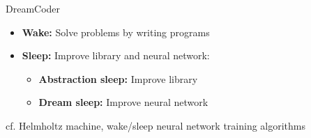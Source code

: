 \documentclass{beamer}
\newcommand{\1}[1]{\mathds{1}\left[#1\right]}
\newcommand\Wider[2][3em]{%
\makebox[\linewidth][c]{%
  \begin{minipage}{\dimexpr\textwidth+#1\relax}
  \raggedright#2
  \end{minipage}%
  }%
}
\begin{document}
\begin{frame}{DreamCoder}
  \begin{itemize}
  \item   \textbf{Wake:} Solve problems by writing programs
  \item \textbf{Sleep:} Improve library and neural network:
    \begin{itemize}
    \item \textbf{Abstraction sleep:} Improve library
      \item \textbf{Dream sleep:} Improve neural network
    \end{itemize}
  \end{itemize}
  \Wider[5.4em]{
    \begin{center}
      \begin{tikzpicture}
  \end{tikzpicture}
        \end{center}}

\hspace*{-0.4cm}\small cf. Helmholtz machine, wake/sleep neural network training algorithms
\end{frame}
\newcommand{\NeuralNetwork}[1]{    \begin{tikzpicture}[x=2.5cm,y=1.25cm,transform canvas={scale=#1,shift={+(-1,2.5)}}]
      \tikzstyle{neuron}=[circle,fill=blue!50,minimum size=20pt]
      \fill[fill=white] (-0.25,-0.5) rectangle (2.25,-4.5);
      \node[rectangle] at (1,1) {};
      \foreach \name / \y in {1,...,4}
          \node[neuron] (I-\name) at (0,-\y) {};
      \foreach \name / \y in {1,...,3}
          \node[neuron] (H-\name) at (1,-\y-0.5) {};
      \foreach \name / \y in {1,...,4}
          \node[neuron] (O-\name) at (2,-\y) {};
      \foreach \source in {1,...,4}
          \foreach \dest in {1,...,3}
              \draw [-latex] (I-\source) -- (H-\dest);
      \foreach \source in {1,...,3}
          \foreach \dest in {1,...,4}
              \draw [-latex] (H-\source) -- (O-\dest);
    \end{tikzpicture}}
\end{document}
